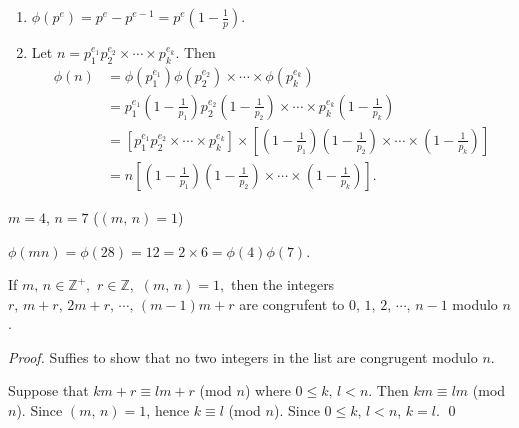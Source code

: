 \begin{remark}
    \begin{enumerate}
        \item $\phi\left(p^e\right) = p^e-p^{e-1} = p^e\left(1-\frac{1}{p}\right)$.
        \item Let $n=p_1^{e_1}p_2^{e_2}\times\cdots\times p_k^{e_k}$. Then
        \begin{align*}
            \phi\left(n\right)&=  \phi\left(p_1^{e_1}\right) \phi\left(p_2^{e_2}\right)\times\cdots\times \phi\left(p_k^{e_k}\right) \\
            &= p_1^{e_1} \left(1-\frac{1}{p_1}\right) p_2^{e_2} \left(1-\frac{1}{p_2}\right) \times\cdots\times p_k^{e_k} \left(1-\frac{1}{p_k}\right) \\
            &= \left[p_1^{e_1} p_2^{e_2} \times\cdots\times p_k^{e_k}\right] \times \left[\left(1-\frac{1}{p_1}\right) \left(1-\frac{1}{p_2}\right) \times\cdots\times \left(1-\frac{1}{p_k}\right)\right] \\
            &= n \left[\left(1-\frac{1}{p_1}\right) \left(1-\frac{1}{p_2}\right) \times\cdots\times \left(1-\frac{1}{p_k}\right)\right].
        \end{align*}
    \end{enumerate}
\end{remark}

\begin{note}
    $m=4$, $n=7$ ($\left(m,\,n\right)=1$)

    $\phi\left(mn\right)=\phi\left(28\right) = 12 = 2 \times 6 =\phi\left(4\right)\phi\left(7\right)$.
\end{note}

\begin{lemma}
    If $m,\,n \in \mathbb{Z}^+,$ $r \in \mathbb{Z},$ $\left(m,\,n\right)=1,$ then
    the integers $r,\,m+r,\,2m+r,\,\cdots,\,\left(m-1\right)m+r$
    are congrufent to $0,\,1,\,2,\,\cdots,\,n-1$ modulo $n$.
\end{lemma}
\begin{proof}
    Suffies to show that no two integers in the list are congrugent modulo $n$.

    Suppose that $km+r \equiv lm+r$ (mod $n$) where $0 \leq k,\,l < n$. Then
    $km \equiv lm$ (mod $n$).
    Since $\left(m,\,n\right)=1$, hence $k \equiv l$ (mod $n$).
    Since $0 \leq k,\,l < n$, $k=l$. \qed
\end{proof}

